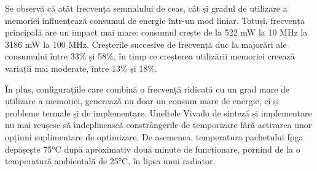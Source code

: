 \documentclass[12pt,a4paper]{report}
\begin{document}
Se observă că atât frecvența semnalului de ceas, cât și gradul de utilizare a memoriei influențează consumul de energie într-un mod liniar. Totuși, frecvența principală are un impact mai mare: consumul crește de la 522 mW la 10 MHz la 3186 mW la 100 MHz. Creșterile succesive de frecvență duc la majorări ale consumului între 33\% și 58\%, în timp ce creșterea utilizării memoriei creează variații mai moderate, între 13\% și 18\%.

În plus, configurațiile care combină o frecvență ridicată cu un grad mare de utilizare a memoriei, generează nu doar un consum mare de energie, ci și probleme termale și de implementare. Uneltele Vivado de sinteză și implementare nu mai reușesc să îndeplinească constrângerile de temporizare fără activarea unor opțiuni suplimentare de optimizare. De asemenea, temperatura pachetului \gls{fpga} depășește 75°C după aproximativ două minute de funcționare, pornind de la o temperatură ambientală de 25°C, în lipsa unui radiator.

        

\end{document}
